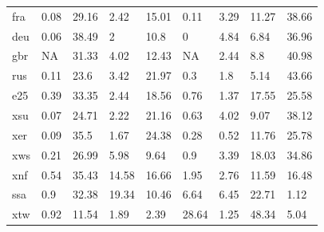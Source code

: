 \documentclass[titlesmallcaps,copyrightpage]{uomthesis}\usepackage[]{graphicx}\usepackage[]{color}
\begin{document}
\begin{table}[htb]
\begin{tabularx}{0.7\textwidth}{lllllllll}
fra & 0.08 & 29.16 & 2.42 & 15.01 & 0.11 & 3.29 & 11.27 & 38.66 \\
deu & 0.06 & 38.49 & 2 & 10.8 & 0 & 4.84 & 6.84 & 36.96 \\
gbr & NA & 31.33 & 4.02 & 12.43 & NA & 2.44 & 8.8 & 40.98 \\
rus & 0.11 & 23.6 & 3.42 & 21.97 & 0.3 & 1.8 & 5.14 & 43.66 \\
e25 & 0.39 & 33.35 & 2.44 & 18.56 & 0.76 & 1.37 & 17.55 & 25.58 \\
xsu & 0.07 & 24.71 & 2.22 & 21.16 & 0.63 & 4.02 & 9.07 & 38.12 \\
xer & 0.09 & 35.5 & 1.67 & 24.38 & 0.28 & 0.52 & 11.76 & 25.78 \\
xws & 0.21 & 26.99 & 5.98 & 9.64 & 0.9 & 3.39 & 18.03 & 34.86 \\
xnf & 0.54 & 35.43 & 14.58 & 16.66 & 1.95 & 2.76 & 11.59 & 16.48 \\
ssa & 0.9 & 32.38 & 19.34 & 10.46 & 6.64 & 6.45 & 22.71 & 1.12 \\
xtw & 0.92 & 11.54 & 1.89 & 2.39 & 28.64 & 1.25 & 48.34 & 5.04 \\
\bottomrule
\end{tabularx}
\end{table}
\end{document}
